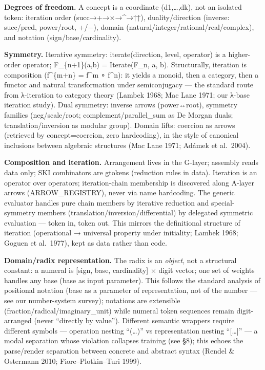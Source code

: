 \documentclass[
]{article}
\begin{document}
\textbf{Degrees of freedom.} A concept is a coordinate (d1,\ldots,dk),
not an isolated token: iteration order (succ→+→×→\^{}→↑↑),
duality/direction (inverse: succ/pred, power/root, +/−), domain
(natural/integer/rational/real/complex), and notation
(sign/base/cardinality).

\textbf{Symmetry.} Iterative symmetry: iterate(direction, level,
operator) is a higher-order operator; F\_\{n+1\}(a,b) = Iterate(F\_n, a,
b). Structurally, iteration is composition (f\^{}\{m+n\} = f\^{}m ∘
f\^{}n): it yields a monoid, then a category, then a functor and natural
transformation under semiconjugacy --- the standard route from
λ-iteration to category theory (Lambek 1968; Mac Lane 1971; our λ-base
iteration study). Dual symmetry: inverse arrows (power↔root), symmetry
families (neg/scale/root; complement/parallel\_sum as De Morgan duals;
translation/inversion as modular group). Domain lifts: coercion as
arrows (retrieved by concept=coercion, zero hardcoding), in the style of
canonical inclusions between algebraic structures (Mac Lane 1971; Adámek
et al.~2004).

\textbf{Composition and iteration.} Arrangement lives in the G-layer;
assembly reads data only; SKI combinators are gtokens (reduction rules
in data). Iteration is an operator over operators; iteration-chain
membership is discovered along A-layer arrows (ARROW\_REGISTRY), never
via name hardcoding. The generic evaluator handles pure chain members by
iterative reduction and special-symmetry members
(translation/inversion/differential) by delegated symmetric evaluation
--- token in, token out. This mirrors the definitional structure of
iteration (operational → universal property under initiality; Lambek
1968; Goguen et al.~1977), kept as data rather than code.

\textbf{Domain/radix representation.} The radix is an \emph{object}, not
a structural constant: a numeral is {[}sign, base, cardinality{]} ×
digit vector; one set of weights handles any base (base as input
parameter). This follows the standard analysis of positional notation
(base as a parameter of representation, not of the number --- see our
number-system survey); notations are extensible
(fraction/radical/imaginary\_unit) while numeral token sequences remain
digit-arranged (never ``directly by value''). Different semantic
wrappers require different symbols --- operation nesting ``(\ldots)'' vs
representation nesting ``{[}\ldots{]}'' --- a modal separation whose
violation collapses training (see §8); this echoes the parse/render
separation between concrete and abstract syntax (Rendel \& Ostermann
2010; Fiore--Plotkin--Turi 1999).
\end{document}
